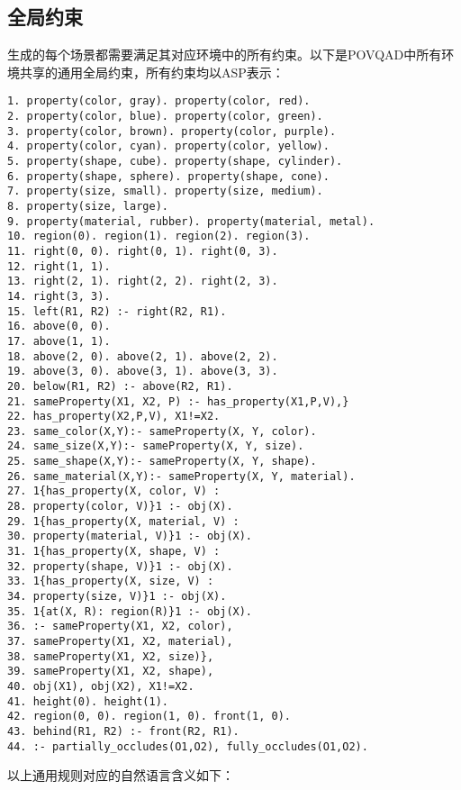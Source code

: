 \subsection{全局约束}
\label{appendix:environment}
生成的每个场景都需要满足其对应环境中的所有约束。以下是POVQAD中所有环境共享的通用全局约束，所有约束均以ASP表示：
\begin{lstlisting}
1. property(color, gray). property(color, red).
2. property(color, blue). property(color, green).
3. property(color, brown). property(color, purple).
4. property(color, cyan). property(color, yellow).
5. property(shape, cube). property(shape, cylinder).
6. property(shape, sphere). property(shape, cone).
7. property(size, small). property(size, medium).
8. property(size, large).
9. property(material, rubber). property(material, metal).
10. region(0). region(1). region(2). region(3).
11. right(0, 0). right(0, 1). right(0, 3).
12. right(1, 1). 
13. right(2, 1). right(2, 2). right(2, 3).
14. right(3, 3).
15. left(R1, R2) :- right(R2, R1).
16. above(0, 0).
17. above(1, 1).
18. above(2, 0). above(2, 1). above(2, 2).
19. above(3, 0). above(3, 1). above(3, 3).
20. below(R1, R2) :- above(R2, R1).
21. sameProperty(X1, X2, P) :- has_property(X1,P,V),}
22. has_property(X2,P,V), X1!=X2.
23. same_color(X,Y):- sameProperty(X, Y, color).
24. same_size(X,Y):- sameProperty(X, Y, size).
25. same_shape(X,Y):- sameProperty(X, Y, shape).
26. same_material(X,Y):- sameProperty(X, Y, material).
27. 1{has_property(X, color, V) :
28. property(color, V)}1 :- obj(X).
29. 1{has_property(X, material, V) :
30. property(material, V)}1 :- obj(X).
31. 1{has_property(X, shape, V) :
32. property(shape, V)}1 :- obj(X).
33. 1{has_property(X, size, V) :
34. property(size, V)}1 :- obj(X).
35. 1{at(X, R): region(R)}1 :- obj(X).
36. :- sameProperty(X1, X2, color),
37. sameProperty(X1, X2, material),
38. sameProperty(X1, X2, size)},
39. sameProperty(X1, X2, shape),
40. obj(X1), obj(X2), X1!=X2.
41. height(0). height(1).
42. region(0, 0). region(1, 0). front(1, 0).
43. behind(R1, R2) :- front(R2, R1).
44. :- partially_occludes(O1,O2), fully_occludes(O1,O2).
\end{lstlisting}
以上通用规则对应的自然语言含义如下：
